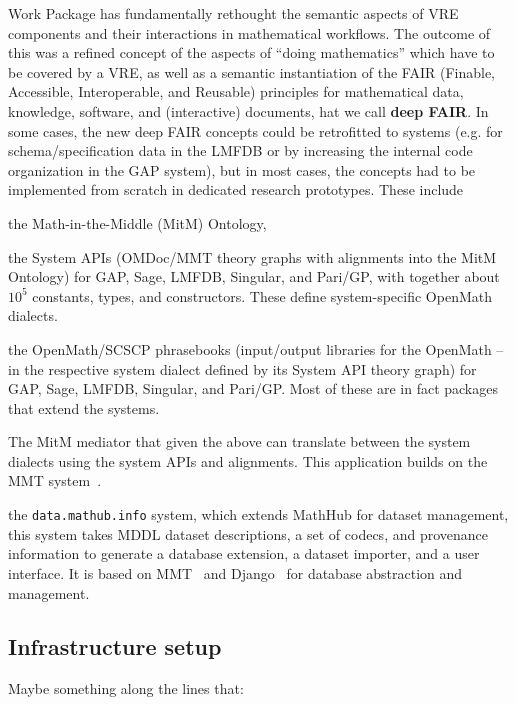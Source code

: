 \documentclass{deliverablereport}
\def\dmh{\texttt{data.mathub.info}\xspace}
\begin{document}
\begin{newpart}
Work Package  has fundamentally rethought the semantic aspects of VRE components and their interactions in mathematical workflows.
The outcome of this was a refined concept of the aspects of ``doing mathematics'' which have to be covered by a VRE, as well as a semantic instantiation of the FAIR (Finable, Accessible, Interoperable, and Reusable) principles for mathematical data, knowledge, software, and (interactive) documents, hat we call \textbf{deep FAIR}. 
In some cases, the new deep FAIR concepts could be retrofitted to \pn systems (e.g. for schema/specification data in the LMFDB or by increasing the internal code organization in the GAP system), but in most cases, the concepts had to be implemented from scratch in dedicated research prototypes. These include
\begin{compactenum}
\item the Math-in-the-Middle (MitM) Ontology,
\item the System APIs (OMDoc/MMT theory graphs with alignments into the MitM Ontology) for GAP, Sage, LMFDB, Singular, and Pari/GP, with together about $10^5$ constants, types, and constructors. These define system-specific OpenMath dialects. 
\item the OpenMath/SCSCP phrasebooks (input/output libraries for the OpenMath -- in the respective system dialect defined by its System API theory graph) for GAP, Sage, LMFDB, Singular, and Pari/GP. Most of these are in fact packages that extend the systems.  
  \item The MitM mediator that  given the above can translate between the system dialects using the system APIs and alignments. This application builds on the MMT system~\cite{uniformal:on}. 
  \item the \dmh system, which extends MathHub for dataset management, this system takes MDDL dataset descriptions, a set of codecs, and provenance information to generate a database extension, a dataset importer, and a user interface.  It is based on MMT~\cite{uniformal:on} and Django~\cite{django:on} for database abstraction and management. 
  \end{compactenum}
\end{newpart}

\subsection{Infrastructure setup}

Maybe something along the lines that:
\end{document}
